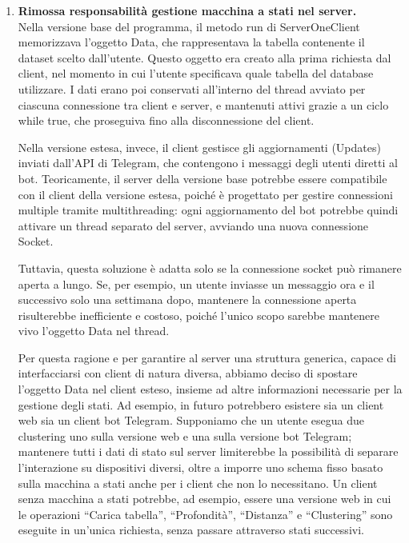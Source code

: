 \begin{enumerate}
    \item \textbf{Rimossa responsabilità gestione macchina a stati nel server.}\\
    Nella versione base del programma, il metodo run di ServerOneClient memorizzava l'oggetto Data, che rappresentava la tabella contenente il dataset scelto dall'utente. Questo oggetto era creato alla prima richiesta dal client, nel momento in cui l'utente specificava quale tabella del database utilizzare. I dati erano poi conservati all'interno del thread avviato per ciascuna connessione tra client e server, e mantenuti attivi grazie a un ciclo while true, che proseguiva fino alla disconnessione del client.
    
    Nella versione estesa, invece, il client gestisce gli aggiornamenti (Updates) inviati dall'API di Telegram, che contengono i messaggi degli utenti diretti al bot. Teoricamente, il server della versione base potrebbe essere compatibile con il client della versione estesa, poiché è progettato per gestire connessioni multiple tramite multithreading: ogni aggiornamento del bot potrebbe quindi attivare un thread separato del server, avviando una nuova connessione Socket.
    
    Tuttavia, questa soluzione è adatta solo se la connessione socket può rimanere aperta a lungo. Se, per esempio, un utente inviasse un messaggio ora e il successivo solo una settimana dopo, mantenere la connessione aperta risulterebbe inefficiente e costoso, poiché l'unico scopo sarebbe mantenere vivo l'oggetto Data nel thread.
    
    Per questa ragione e per garantire al server una struttura generica, capace di interfacciarsi con client di natura diversa, abbiamo deciso di spostare l'oggetto Data nel client esteso, insieme ad altre informazioni necessarie per la gestione degli stati. Ad esempio, in futuro potrebbero esistere sia un client web sia un client bot Telegram. Supponiamo che un utente esegua due clustering uno sulla versione web e una sulla versione bot Telegram; mantenere tutti i dati di stato sul server limiterebbe la possibilità di separare l'interazione su dispositivi diversi, oltre a imporre uno schema fisso basato sulla macchina a stati anche per i client che non lo necessitano. Un client senza macchina a stati potrebbe, ad esempio, essere una versione web in cui le operazioni ``Carica tabella'', ``Profondità'', ``Distanza'' e ``Clustering'' sono eseguite in un'unica richiesta, senza passare attraverso stati successivi.
    

\end{enumerate}

